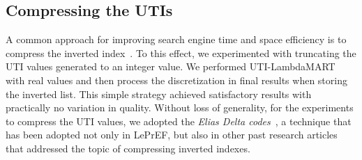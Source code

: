 \documentclass[preprint,review,10pt,3p]{elsarticle}
\begin{document}










\begin{figure}[h!]
\centering



\end{figure}


\subsection{Compressing the UTIs}

\label{sec:compression}


A common approach for improving search engine time and space
efficiency is to compress the inverted
index~\cite{baezaribeiro2011modinforet}. To this effect, we
experimented with truncating the UTI values generated to an integer
value. We performed UTI-LambdaMART with real values and then process
the discretization in final results when storing the inverted list.
This simple strategy achieved satisfactory results with practically no
variation in quality. Without loss of generality, for the experiments
to compress the UTI values, we adopted the \textit{Elias Delta
codes}~\cite{elias1975universal}, a technique that has been adopted
not only in LePrEF, but also in other past research articles that
addressed the topic of compressing inverted indexes.
\end{document}

